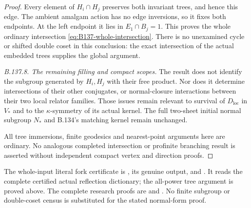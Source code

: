\begin{proof}
Every element of $H_i\cap H_j$ preserves both invariant
trees, and hence this edge. The ambient amalgam action has
no edge inversions, so it fixes both endpoints. At the left
endpoint it lies in $E_1\cap B_j=1$. This proves the whole
ordinary intersection \eqref{eq:B137-whole-intersection}.
There is no unexamined cycle or shifted double coset in
this conclusion: the exact intersection of the actual
embedded trees supplies the global argument.

\emph{B.137.8. The remaining filling and compact scopes.}
The result does not identify the subgroup generated by
$H_i,H_j$ with their free product. Nor does it determine
intersections of their other conjugates, or normal-closure
interactions between their two local relator families.
Those issues remain relevant to survival of
$D_{\mathrm{loc}}$ in $V_*$ and to the $\kappa$-symmetry
of its actual kernel. The full two-sheet initial normal
subgroup $N_*$ and B.134's matching kernel remain unchanged.

All tree immersions, finite geodesics and nearest-point
arguments here are ordinary. No analogous completed
intersection or profinite branching result is asserted
without independent compact vertex and direction proofs.
\end{proof}

\begingroup\raggedright\footnotesize
The whole-input literal fork certificate is
,
its genuine output, and
.
It reads the complete certified actual reflection dictionary;
the all-power tree argument is proved above. The complete
research proofs are
and
.
No finite subgroup or double-coset census is substituted for
the stated normal-form proof.
\par\endgroup
